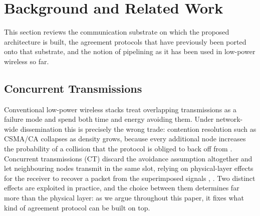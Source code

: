 \documentclass[journal]{IEEEtran}
\begin{document}

\section{Background and Related Work}
\label{sec:back}
This section reviews the communication substrate on which the proposed
architecture is built, the agreement protocols that have previously been
ported onto that substrate, and the notion of pipelining as it has been
used in low-power wireless so far.

\subsection{Concurrent Transmissions}
\label{sec:back-ct}

Conventional low-power wireless stacks treat overlapping transmissions as
a failure mode and spend both time and energy avoiding them. Under
network-wide dissemination this is precisely the wrong trade: contention
resolution such as CSMA/CA collapses as density grows, because every
additional node increases the probability of a collision that the protocol
is obliged to back off from \cite{zimmerling20survey}. Concurrent
transmissions (CT) discard the avoidance assumption altogether and let
neighbouring nodes transmit in the same slot, relying on physical-layer
effects for the receiver to recover a packet from the superimposed signals
\cite{zimmerling20survey}, \cite{wilhelm14reception}. Two distinct effects
are exploited in practice, and the choice between them determines far more
than the physical layer: as we argue throughout this paper, it fixes what
kind of agreement protocol can be built on top.
\end{document}
